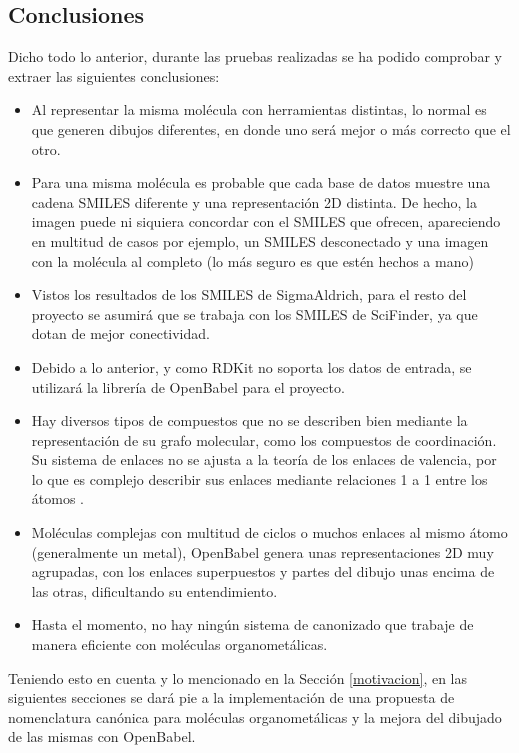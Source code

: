 \subsection{Conclusiones}
Dicho todo lo anterior, durante las pruebas realizadas se ha podido comprobar y extraer las siguientes conclusiones:

\begin{itemize}
    \item Al representar la misma molécula con herramientas distintas, lo normal es que generen dibujos diferentes, en donde uno será mejor o más correcto que el otro.
    \item Para una misma molécula es probable que cada base de datos muestre una cadena SMILES diferente y una representación 2D distinta. De hecho, la imagen puede ni siquiera concordar con el SMILES que ofrecen, apareciendo en multitud de casos por ejemplo, un SMILES desconectado y una imagen con la molécula al completo (lo más seguro es que estén hechos a mano)
    \item Vistos los resultados de los SMILES de SigmaAldrich, para el resto del proyecto se asumirá que se trabaja con los SMILES de SciFinder, ya que dotan de mejor conectividad. 
    \item Debido a lo anterior, y como RDKit no soporta los datos de entrada, se utilizará la librería de OpenBabel para el proyecto.
    \item Hay diversos tipos de compuestos que no se describen bien mediante la representación de su grafo molecular, como los compuestos de coordinación. Su sistema de enlaces no se ajusta a la teoría de los enlaces de valencia, por lo que es complejo describir sus enlaces mediante relaciones 1 a 1 entre los átomos \cite{david_molecular_2020}.
    \item Moléculas complejas con multitud de ciclos o muchos enlaces al mismo átomo (generalmente un metal), OpenBabel genera unas representaciones 2D muy agrupadas, con los enlaces superpuestos y partes del dibujo unas encima de las otras, dificultando su entendimiento.
    \item Hasta el momento, no hay ningún sistema de canonizado que trabaje de manera eficiente con moléculas organometálicas.
    
\end{itemize}


Teniendo esto en cuenta y lo mencionado en la Sección \ref{motivacion}, en las siguientes secciones se dará pie a la implementación de una propuesta de nomenclatura canónica para moléculas organometálicas y la mejora del dibujado de las mismas con OpenBabel.





